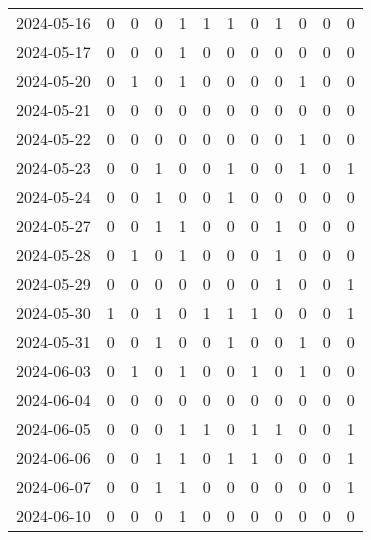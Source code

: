 \documentclass[dvipdfmx,oneside]{article}
\begin{document}
\begin{tabular}{lccccccccccc}
        2024-05-16 &     0 &     0 &     0 &     1 &     1 &     1 &     0 &     1 &     0 &     0 &     0 \\
        2024-05-17 &     0 &     0 &     0 &     1 &     0 &     0 &     0 &     0 &     0 &     0 &     0 \\
        2024-05-20 &     0 &     1 &     0 &     1 &     0 &     0 &     0 &     0 &     1 &     0 &     0 \\
        2024-05-21 &     0 &     0 &     0 &     0 &     0 &     0 &     0 &     0 &     0 &     0 &     0 \\
        2024-05-22 &     0 &     0 &     0 &     0 &     0 &     0 &     0 &     0 &     1 &     0 &     0 \\
        2024-05-23 &     0 &     0 &     1 &     0 &     0 &     1 &     0 &     0 &     1 &     0 &     1 \\
        2024-05-24 &     0 &     0 &     1 &     0 &     0 &     1 &     0 &     0 &     0 &     0 &     0 \\
        2024-05-27 &     0 &     0 &     1 &     1 &     0 &     0 &     0 &     1 &     0 &     0 &     0 \\
        2024-05-28 &     0 &     1 &     0 &     1 &     0 &     0 &     0 &     1 &     0 &     0 &     0 \\
        2024-05-29 &     0 &     0 &     0 &     0 &     0 &     0 &     0 &     1 &     0 &     0 &     1 \\
        2024-05-30 &     1 &     0 &     1 &     0 &     1 &     1 &     1 &     0 &     0 &     0 &     1 \\
        2024-05-31 &     0 &     0 &     1 &     0 &     0 &     1 &     0 &     0 &     1 &     0 &     0 \\
        2024-06-03 &     0 &     1 &     0 &     1 &     0 &     0 &     1 &     0 &     1 &     0 &     0 \\
        2024-06-04 &     0 &     0 &     0 &     0 &     0 &     0 &     0 &     0 &     0 &     0 &     0 \\
        2024-06-05 &     0 &     0 &     0 &     1 &     1 &     0 &     1 &     1 &     0 &     0 &     1 \\
        2024-06-06 &     0 &     0 &     1 &     1 &     0 &     1 &     1 &     0 &     0 &     0 &     1 \\
        2024-06-07 &     0 &     0 &     1 &     1 &     0 &     0 &     0 &     0 &     0 &     0 &     1 \\
        2024-06-10 &     0 &     0 &     0 &     1 &     0 &     0 &     0 &     0 &     0 &     0 &     0 \\

\end{tabular}
\end{document}
